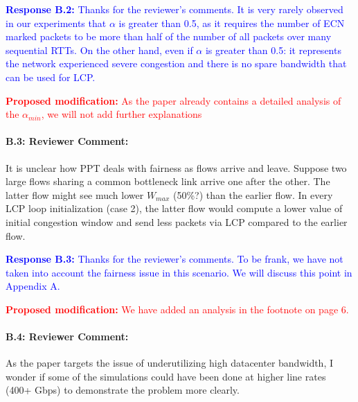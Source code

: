 \documentclass[12pt,one-column]{article}
\begin{document}
\noindent\textcolor{blue}{\textbf{Response B.2:}
Thanks for the reviewer’s comments. 
It is very rarely observed in our experiments that $\alpha$ is greater than 0.5, as it requires the number of ECN marked packets to be more than half of the number of all packets over many sequential RTTs.
On the other hand, even if $\alpha$ is greater than 0.5: it represents the network experienced severe congestion and there is no spare bandwidth that can be used for LCP.
}

\noindent\textcolor{red}{\textbf{Proposed modification: }
As the paper already contains a detailed analysis of the $\alpha_{min}$, we will not add further explanations
}

{\it \paragraph{B.3: Reviewer Comment:} It is unclear how PPT deals with fairness as flows arrive and leave. Suppose two large flows sharing a common bottleneck link arrive one after the other. The latter flow might see much lower $W_{max}$ (50\%?) than the earlier flow. In every LCP loop initialization (case 2), the latter flow would compute a lower value of initial congestion window and send less packets via LCP compared to the earlier flow.}



\noindent\textcolor{blue}{\textbf{Response B.3:}
Thanks for the reviewer’s comments. 
To be frank, we have not taken into account the fairness issue in this scenario.
We will discuss this point in Appendix A.
}

\noindent\textcolor{red}{\textbf{Proposed modification: }
We have added an analysis in the footnote on page 6.
}

{\it \paragraph{B.4: Reviewer Comment:} As the paper targets the issue of underutilizing high datacenter bandwidth, I wonder if some of the simulations could have been done at higher line rates (400+ Gbps) to demonstrate the problem more clearly.}
\end{document}
